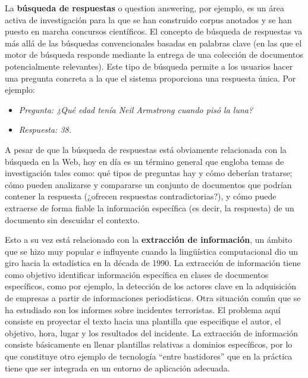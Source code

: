 \begin{multicols}{2}

La \textbf{búsqueda de respuestas} o question answering, por ejemplo, es un área activa de investigación para la que se han construido corpus anotados y se han puesto en marcha concursos científicos. El concepto de búsqueda de respuestas va más allá de las búsquedas convencionales basadas en palabras clave (en las que el motor de búsqueda responde mediante la entrega de una colección de documentos potencialmente relevantes). Este tipo de búsqueda permite a los usuarios hacer una pregunta concreta a la que el sistema proporciona una respuesta única. Por ejemplo:

\begin{itemize}
  \item[] \textit{Pregunta: ¿Qué edad tenía Neil Armstrong cuando pisó la luna?}
  \item[] \textit{Respuesta: 38.}
\end{itemize}

A pesar de que la búsqueda de respuestas está obviamente relacionada con la búsqueda en la Web, hoy en día es un término general que engloba temas de investigación tales como: qué tipos de preguntas hay y cómo deberían tratarse; cómo pueden analizarse y compararse un conjunto de documentos que podrían contener la respuesta (¿ofrecen respuestas contradictorias?), y cómo puede extraerse de forma fiable la información específica (es decir, la respuesta) de un documento sin descuidar el contexto. 

Esto a su vez está relacionado con la \textbf{extracción de información}, un ámbito que se hizo muy popular e influyente cuando la lingüística computacional dio un giro hacia la estadística en la década de 1990. La extracción de información tiene como objetivo identificar información específica en clases de documentos específicos, como por ejemplo, la detección de los actores clave en la adquisición de empresas a partir de informaciones periodísticas. Otra situación común que se ha estudiado son los informes sobre incidentes terroristas. El problema aquí consiste en proyectar el texto hacia una plantilla que especifique el autor, el objetivo, hora, lugar y los resultados del incidente. La extracción de información consiste básicamente en llenar plantillas relativas a dominios específicos, por lo que constituye otro ejemplo de tecnología “entre bastidores” que en la práctica tiene que ser integrada en un entorno de aplicación adecuada. 


\end{multicols}
